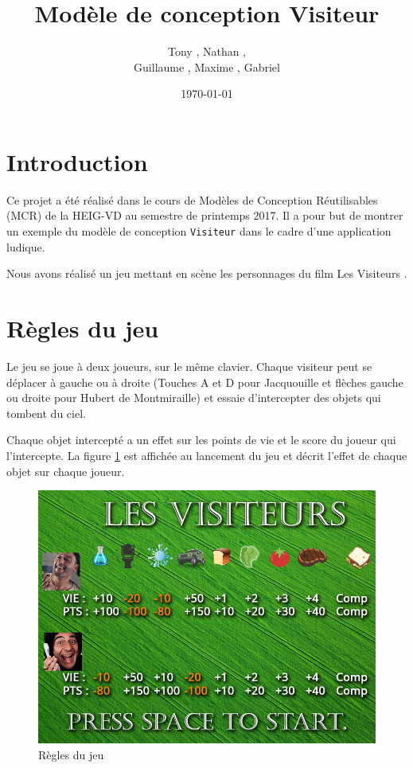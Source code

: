 \documentclass[11pt,a4paper,twoside]{article}
\title{\huge\bfseries Modèle de conception Visiteur}
\author{Tony \bsc{Clavien}, Nathan \bsc{Gonzalez Montes}, \\ Guillaume \bsc{Milani}, Maxime \bsc{Guillod}, Gabriel \bsc{Luthier}}
\date{\today}
\begin{document}
\maketitle
%
\section*{Introduction}
Ce projet a été réalisé dans le cours de Modèles de Conception Réutilisables (MCR) de la HEIG-VD au semestre de printemps 2017. Il a pour but de montrer un exemple du modèle de conception \texttt{Visiteur} dans le cadre d'une application ludique.

Nous avons réalisé un jeu mettant en scène les personnages du film \og Les Visiteurs \fg.

\section*{Règles du jeu}
Le jeu se joue à deux joueurs, sur le même clavier. Chaque visiteur peut se déplacer à gauche ou à droite (Touches A et D pour Jacquouille et flèches gauche ou droite pour Hubert de Montmiraille) et essaie d'intercepter des objets qui tombent du ciel.

Chaque objet intercepté a un effet sur les points de vie et le score du joueur qui l'intercepte. La figure \ref{regles} est affichée au lancement du jeu et décrit l'effet de chaque objet sur chaque joueur.
\begin{figure}[!ht]
	\center
	\includegraphics[scale=0.5]{../Game/src/resources/images/regles}
	\caption{Règles du jeu}
	\label{regles}
\end{figure}
\end{document}
